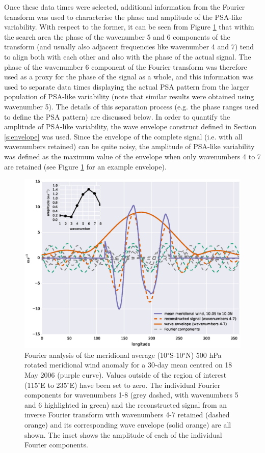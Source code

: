 Once these data times were selected, additional information from the Fourier transform was used to characterise the phase and amplitude of the PSA-like variability. With respect to the former, it can be seen from Figure \ref{fig:transform} that within the search area the phase of the wavenumber 5 and 6 components of the transform (and usually also adjacent frequencies like wavenumber 4 and 7) tend to align both with each other and also with the phase of the actual signal. The phase of the wavenumber 6 component of the Fourier transform was therefore used as a proxy for the phase of the signal as a whole, and this information was used to separate data times displaying the actual PSA pattern from the larger population of PSA-like variability (note that similar results were obtained using wavenumber 5). The details of this separation process (e.g. the phase ranges used to define the PSA pattern) are discussed below. In order to quantify the amplitude of PSA-like variability, the wave envelope construct defined in Section \ref{s:envelope} was used. Since the envelope of the complete signal (i.e. with all wavenumbers retained) can be quite noisy, the amplitude of PSA-like variability was defined as the maximum value of the envelope when only wavenumbers 4 to 7 are retained (see Figure \ref{fig:transform} for an example envelope).

\begin{figure}
\begin{center}
\includegraphics[width=0.84\columnwidth]{figures/psa/psa_check_2006-05-18_10S-10N_hilbert.eps}
\caption[Fourier analysis of the meridional average (10$^{\circ}$S-10$^{\circ}$N) 500 hPa rotated meridional wind anomaly for a 30-day mean centred on 18 May 2006]{\label{fig:transform}
Fourier analysis of the meridional average (10$^{\circ}$S-10$^{\circ}$N) 500 hPa rotated meridional wind anomaly for a 30-day mean centred on 18 May 2006 (purple curve). Values outside of the region of interest (115$^{\circ}$E to 235$^{\circ}$E) have been set to zero. The individual Fourier components for wavenumbers 1-8 (grey dashed, with wavenumbers 5 and 6 highlighted in green) and the reconstructed signal from an inverse Fourier transform with wavenumbers 4-7 retained (dashed orange) and its corresponding wave envelope (solid orange) are all shown. The inset shows the amplitude of each of the individual Fourier components.
}
\end{center}
\end{figure}

